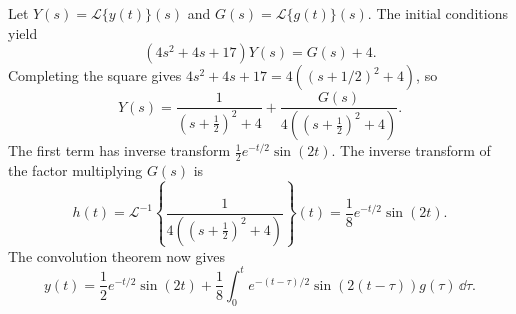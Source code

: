 \documentclass[11pt,oneside]{article}
\begin{document}
\begin{solution}
Let $Y(s)=\mathcal{L}\{y(t)\}(s)$ and $G(s)=\mathcal{L}\{g(t)\}(s)$. The initial conditions yield
\[
    (4s^2+4s+17)Y(s)=G(s)+4.
\]
Completing the square gives $4s^2+4s+17=4((s+1/2)^2+4)$, so
\[
    Y(s)=\frac{1}{(s+\tfrac12)^2+4}
    +\frac{G(s)}{4((s+\tfrac12)^2+4)}.
\]
The first term has inverse transform $\frac{1}{2}e^{-t/2}\sin(2t)$. The inverse transform of the factor multiplying $G(s)$ is
\[
    h(t)=\mathcal{L}^{-1}\left\{\frac{1}{4((s+\tfrac12)^2+4)}\right\}(t)
        =\frac{1}{8}e^{-t/2}\sin(2t).
\]
The convolution theorem now gives
\[
    \boxed{
        y(t)=\frac{1}{2}e^{-t/2}\sin(2t)
        +\frac{1}{8}\int_0^t e^{-(t-\tau)/2}\sin(2(t-\tau))g(\tau)\,\dd\tau
    }.
\]
\end{solution}
\end{document}
